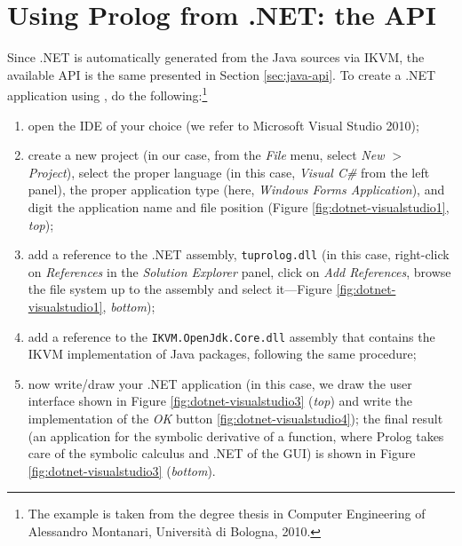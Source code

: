 \section{Using Prolog from .NET: the API}
\label{sec:dotnet-oo-api}

Since \tuprolog{}.NET is automatically generated from the Java sources via IKVM, the available API is the same presented in Section \ref{sec:java-api}.
%
To create a .NET application using \tuprolog{}, do the following:\footnote{The example is taken from the degree thesis in Computer Engineering of Alessandro Montanari, Universit\`{a} di Bologna, 2010.}

\begin{enumerate}
  \item open the IDE of your choice (we refer to Microsoft Visual Studio 2010);
  \item create a new project (in our case, from the \textit{File} menu, select \textit{New $>$ Project}), select the proper language (in this case, \textit{Visual C\#} from the left panel), the proper application type (here, \textit{Windows Forms Application}), and digit the application name and file position (Figure \ref{fig:dotnet-visualstudio1}, \textit{top});
  \item add a reference to the \tuprolog{}.NET assembly, \texttt{tuprolog.dll} (in this case, right-click on \textit{References} in the \textit{Solution Explorer} panel, click on \textit{Add References}, browse the file system up to the assembly and select it---Figure \ref{fig:dotnet-visualstudio1}, \textit{bottom});
  \item add a reference to the \texttt{IKVM.OpenJdk.Core.dll} assembly that contains the IKVM implementation of Java packages, following the same procedure;
  \item now write/draw your .NET application (in this case, we draw the user interface shown in Figure \ref{fig:dotnet-visualstudio3} (\textit{top}) and write the implementation of the \textit{OK} button \ref{fig:dotnet-visualstudio4}); the final result (an application for the symbolic derivative of a function, where Prolog takes care of the symbolic calculus and .NET of the GUI) is shown in Figure \ref{fig:dotnet-visualstudio3} (\textit{bottom}).
\end{enumerate}

